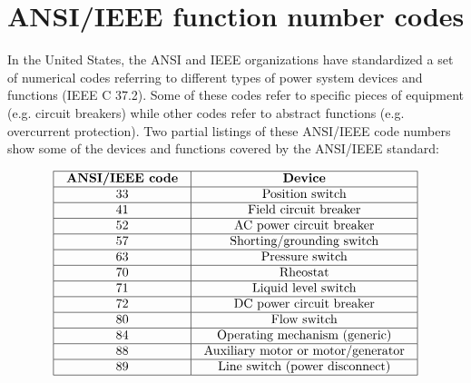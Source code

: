 \filbreak
\section{ANSI/IEEE function number codes}

In the United States, the ANSI and IEEE organizations have standardized a set of numerical codes referring to different types of power system devices and functions (IEEE C 37.2).  Some of these codes refer to specific pieces of equipment (e.g. circuit breakers) while other codes refer to abstract functions (e.g. overcurrent protection).  Two partial listings of these ANSI/IEEE code numbers show some of the devices and functions covered by the ANSI/IEEE standard:      


$$\vbox{\offinterlineskip
\halign{\strut
\vrule \quad\hfil # \ \hfil & 
\vrule \quad\hfil # \ \hfil \vrule \cr
\noalign{\hrule}
%
\textbf{ANSI/IEEE code} & \textbf{Device} \cr
%
\noalign{\hrule}
%
33 & Position switch \cr
%
\noalign{\hrule}
%
41 & Field circuit breaker \cr
%
\noalign{\hrule}
%
52 & AC power circuit breaker \cr
%
\noalign{\hrule}
%
57 & Shorting/grounding switch \cr
%
\noalign{\hrule}
%
63 & Pressure switch \cr
%
\noalign{\hrule}
%
70 & Rheostat \cr
%
\noalign{\hrule}
%
71 & Liquid level switch \cr
%
\noalign{\hrule}
%
72 & DC power circuit breaker \cr
%
\noalign{\hrule}
%
80 & Flow switch \cr
%
\noalign{\hrule}
%
84 & Operating mechanism (generic) \cr
%
\noalign{\hrule}
%
88 & Auxiliary motor or motor/generator \cr
%
\noalign{\hrule}
%
89 & Line switch (power disconnect) \cr
%
\noalign{\hrule}
} %
}$$ %


\filbreak



